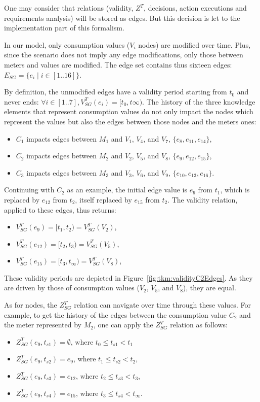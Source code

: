 One may consider that relations (validity, $Z^T$, decisions, action executions and requirements analysis) will be stored as edges.
But this decision is let to the implementation part of this formalism.

In our model, only consumption values ($V_i$ nodes) are modified over time.
Plus, since the scenario does not imply any edge modifications, only those between meters and values are modified.
The edge set contains thus sixteen edges: $E_{SG} = \{e_i \mid i \in [1..16] \}$.

By definition, the unmodified edges have a validity period starting from $t_0$ and never ends: $\forall i \in [1..7], V^T_{SG}(e_i) = [t_0, t\infty)$.
The history of the three knowledge elements that represent consumption values do not only impact the nodes which represent the values but also the edges between those nodes and the meters ones:
\begin{itemize}
    \item $C_1$ impacts edges between $M_1$ and $V_1$, $V_4$, and $V_7$, \ie $\{e_8, e_{11}, e_{14}\}$,
    \item $C_2$ impacts edges between $M_2$ and $V_2$, $V_5$, and $V_8$, \ie $\{e_9, e_{12}, e_{15}\}$,
    \item $C_3$ impacts edges between $M_3$ and $V_3$, $V_6$, and $V_9$, \ie $\{e_{10}, e_{13}, e_{16}\}$.
\end{itemize}

Continuing with $C_2$ as an example, the initial edge value is $e_9$ from $t_1$, which is replaced by $e_{12}$ from $t_2$, itself replaced by $e_{15}$ from $t_2$.
The validity relation, applied to these edges, thus returns:
\begin{itemize}
    \item $V^T_{SG}(e_9) = [t_1, t_2) = V^T_{SG}(V_2)$,
    \item $V^T_{SG}(e_{12}) = [t_2, t_3) = V^T_{SG}(V_5)$,
    \item $V^T_{SG}(e_{15}) = [t_3, t_\infty) = V^T_{SG}(V_8)$,
\end{itemize}

These validity periods are depicted in Figure~\ref{fig:tkm:validityC2Edges}.
As they are driven by those of consumption values ($V_2$, $V_5$, and $V_8$), they are equal.

As for nodes, the $Z^T_{SG}$ relation can navigate over time through these values.
For example, to get the history of the edges between the consumption value $C_2$ and the meter represented by $M_2$, one can apply the $Z^T_{SG}$ relation as follows:
\begin{itemize}
    \item $Z^T_{SG}(e_9, t_{s1}) = \emptyset$, where $t_0 \leqslant t_{s1} < t_1$
    \item $Z^T_{SG}(e_9, t_{s2}) = e_9$, where $t_1 \leqslant t_{s2} < t_2$,
    \item $Z^T_{SG}(e_9, t_{s3}) = e_12$, where $t_2 \leqslant t_{s3} < t_3$,
    \item $Z^T_{SG}(e_9, t_{s4}) = e_15$, where $t_3 \leqslant t_{s4} < t_\infty$.
\end{itemize}


